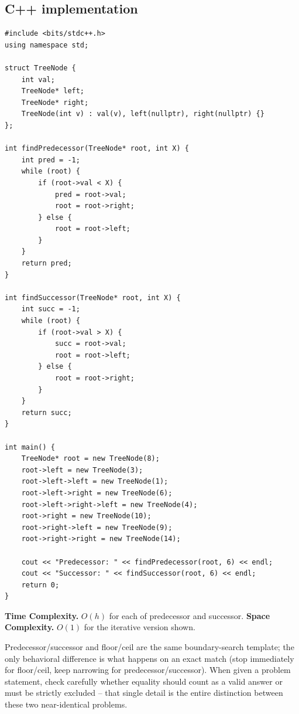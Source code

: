 \subsection*{C++ implementation}

\begin{lstlisting}
#include <bits/stdc++.h>
using namespace std;

struct TreeNode {
    int val;
    TreeNode* left;
    TreeNode* right;
    TreeNode(int v) : val(v), left(nullptr), right(nullptr) {}
};

int findPredecessor(TreeNode* root, int X) {
    int pred = -1;
    while (root) {
        if (root->val < X) {
            pred = root->val;
            root = root->right;
        } else {
            root = root->left;
        }
    }
    return pred;
}

int findSuccessor(TreeNode* root, int X) {
    int succ = -1;
    while (root) {
        if (root->val > X) {
            succ = root->val;
            root = root->left;
        } else {
            root = root->right;
        }
    }
    return succ;
}

int main() {
    TreeNode* root = new TreeNode(8);
    root->left = new TreeNode(3);
    root->left->left = new TreeNode(1);
    root->left->right = new TreeNode(6);
    root->left->right->left = new TreeNode(4);
    root->right = new TreeNode(10);
    root->right->left = new TreeNode(9);
    root->right->right = new TreeNode(14);

    cout << "Predecessor: " << findPredecessor(root, 6) << endl;
    cout << "Successor: " << findSuccessor(root, 6) << endl;
    return 0;
}
\end{lstlisting}

\begin{complexitybox}
\textbf{Time Complexity.} $O(h)$ for each of predecessor and successor.
\textbf{Space Complexity.} $O(1)$ for the iterative version shown.
\end{complexitybox}

\begin{takeawaybox}
Predecessor/successor and floor/ceil are the same boundary-search
template; the only behavioral difference is what happens on an exact
match (stop immediately for floor/ceil, keep narrowing for
predecessor/successor). When given a problem statement, check carefully
whether equality should count as a valid answer or must be strictly
excluded -- that single detail is the entire distinction between these
two near-identical problems.
\end{takeawaybox}
